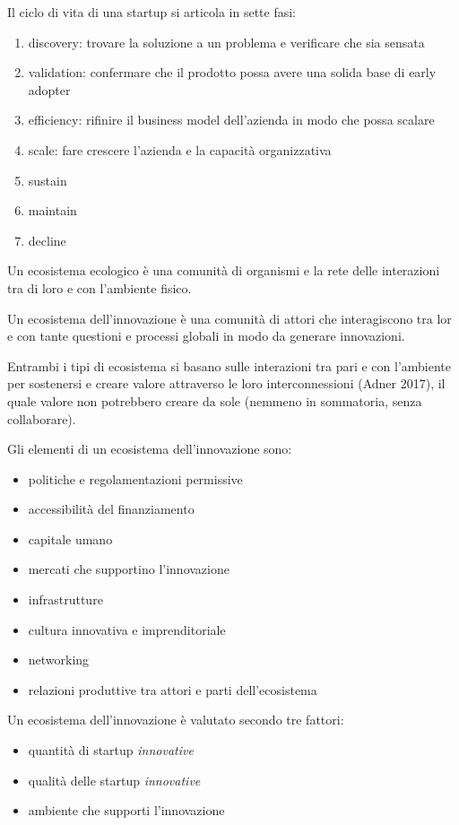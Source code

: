 \documentclass[answers, a4paper, 11pt]{exam}
\begin{document}
Il ciclo di vita di una startup si articola in sette fasi:

\begin{enumerate}
    \item discovery: trovare la soluzione a un problema e verificare che sia sensata
    \item validation: confermare che il prodotto possa avere una solida base di early adopter
    \item efficiency: rifinire il business model dell'azienda in modo che possa scalare
    \item scale: fare crescere l'azienda e la capacità organizzativa
    \item sustain
    \item maintain
    \item decline
\end{enumerate}

Un ecosistema ecologico è una comunità di organismi e la rete delle interazioni tra di loro e con l'ambiente fisico.

Un ecosistema dell'innovazione è una comunità di attori che interagiscono tra lor e con tante questioni e processi globali in modo da generare innovazioni.

Entrambi i tipi di ecosistema si basano sulle interazioni tra pari e con l'ambiente per sostenersi e creare valore attraverso le loro interconnessioni (Adner 2017), il quale valore non potrebbero creare da sole (nemmeno in sommatoria, senza collaborare).

Gli elementi di un ecosistema dell'innovazione sono:
\begin{itemize}
    \item politiche e regolamentazioni permissive
    \item accessibilità del finanziamento
    \item capitale umano
    \item mercati che supportino l'innovazione
    \item infrastrutture
    \item cultura innovativa e imprenditoriale
    \item networking
    \item relazioni produttive tra attori e parti dell'ecosistema
\end{itemize}

Un ecosistema dell'innovazione è valutato secondo tre fattori:

\begin{itemize}
    \item quantità di startup \emph{innovative}
    \item qualità delle startup \emph{innovative}
    \item ambiente che supporti l'innovazione
\end{itemize}
\end{document}
